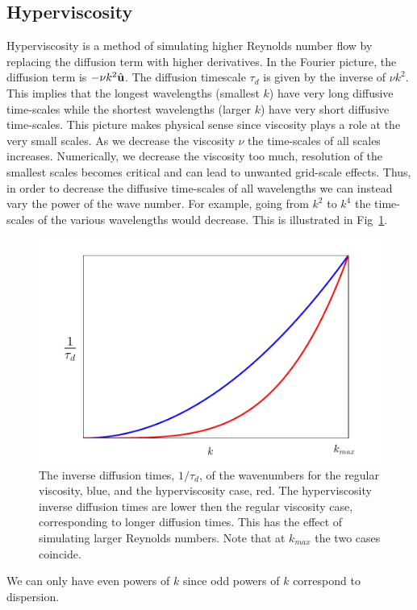 \subsection{Hyperviscosity}
Hyperviscosity is a method of simulating higher Reynolds number flow by replacing the diffusion term with higher derivatives. In the Fourier picture, the diffusion term is $-\nu k^{2}\hat{\textbf{u}}$. The diffusion timescale $\tau_{d}$ is given by the inverse of $\nu k^{2}$. This implies that the longest wavelengths (smallest $k$) have very long diffusive time-scales while the shortest wavelengths (larger $k$) have very short diffusive time-scales. This picture makes physical sense since viscosity plays a role at the very small scales. As we decrease the viscosity $\nu$ the time-scales of all scales increases. Numerically, we decrease the viscosity too much, resolution of the smallest scales becomes critical and can lead to unwanted grid-scale effects. Thus, in order to decrease the diffusive time-scales of all wavelengths we can instead vary the power of the wave number. For example, going from $k^{2}$ to $k^{4}$ the time-scales of the various wavelengths would decrease. This is illustrated in Fig~\ref{hyper_vis_example}.

\begin{figure}
\begin{center}
\includegraphics[width=\textwidth]{hyper_vis_example.pdf}
\caption{The inverse diffusion times, $1/\tau_{d}$, of the wavenumbers for the regular viscosity, blue, and the hyperviscosity case, red. The hyperviscosity inverse diffusion times are lower then the regular viscosity case, corresponding to longer diffusion times. This has the effect of simulating larger Reynolds numbers. Note that at $k_{max}$ the two cases coincide.}
\end{center}
\label{hyper_vis_example}
\end{figure}
We can only have even powers of $k$ since odd powers of $k$ correspond to dispersion. 

